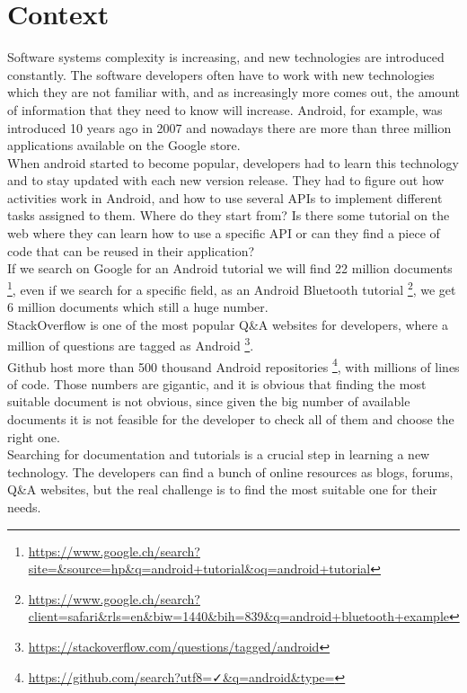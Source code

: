 \documentclass[mscthesis,20pt]{usiinfthesis}
\begin{document}
	\section{Context}
	Software systems complexity is increasing, and new technologies are introduced constantly. The software developers often have to work with new technologies which they are not familiar with, and as increasingly more comes out, the amount of information that they need to know will increase. Android, for example, was introduced 10 years ago in 2007 and nowadays there are more than three million applications available on the Google store. \\
	When android started to become popular, developers had to learn this technology and to stay updated with each new version release. 
	They had to figure out how activities work in Android, and how to use several APIs to implement different tasks assigned to them. Where do they start from? Is there some tutorial on the web where they can learn how to use a specific API or can they find a piece of code that can be reused in their application? \\
	If we search on Google for an Android tutorial we will find 22 million documents \footnote{\url{https://www.google.ch/search?site=&source=hp&q=android+tutorial&oq=android+tutorial}}, even if we search for a specific field, as an Android Bluetooth tutorial \footnote{\url{https://www.google.ch/search?client=safari&rls=en&biw=1440&bih=839&q=android+bluetooth+example}}, we get 6 million documents which still a huge number.\\
	StackOverflow is one of the most popular Q\&A websites for developers, where a million of questions are tagged as Android  \footnote{\url{https://stackoverflow.com/questions/tagged/android}}. \\
	Github host more than 500 thousand Android repositories \footnote{\url{https://github.com/search?utf8=✓&q=android&type=}}, with millions of lines of code. Those numbers are gigantic, and it is obvious that finding the most suitable document is not obvious, since given the big number of available documents it is not feasible for the developer to check all of them and choose the right one.\\
	Searching for documentation and tutorials is a crucial step in learning a new technology. The developers can find a bunch of online resources as blogs, forums, Q\&A websites, but the real challenge is to find the most suitable one for their needs.
\end{document}
